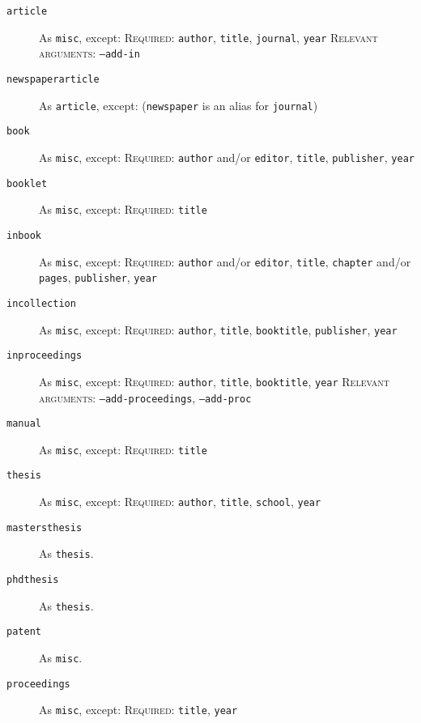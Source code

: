 \documentclass{article}
\begin{document}
\begin{description}
\item[\texttt{article}] As \texttt{misc}, except:
\textsc{Required:} \texttt{author}, \texttt{title}, \texttt{journal}, \texttt{year}
\textsc{Relevant arguments:} \texttt{--add-in}

\item[\texttt{newspaperarticle}] As \texttt{article}, except: (\texttt{newspaper} is an alias for \texttt{journal})

\item[\texttt{book}] As \texttt{misc}, except:
\textsc{Required:} \texttt{author} and/or \texttt{editor}, \texttt{title}, \texttt{publisher}, \texttt{year}

\item[\texttt{booklet}] As \texttt{misc}, except:
\textsc{Required:} \texttt{title}

\item[\texttt{inbook}] As \texttt{misc}, except:
\textsc{Required:} \texttt{author} and/or \texttt{editor}, \texttt{title}, \texttt{chapter} and/or \texttt{pages}, \texttt{publisher}, \texttt{year}

\item[\texttt{incollection}] As \texttt{misc}, except:
\textsc{Required:} \texttt{author}, \texttt{title}, \texttt{booktitle}, \texttt{publisher}, \texttt{year}

\item[\texttt{inproceedings}] As \texttt{misc}, except:
\textsc{Required:} \texttt{author}, \texttt{title}, \texttt{booktitle}, \texttt{year}
\textsc{Relevant arguments:} \texttt{--add-proceedings}, \texttt{--add-proc}

\item[\texttt{manual}] As \texttt{misc}, except:
\textsc{Required:} \texttt{title}

\item[\texttt{thesis}] As \texttt{misc}, except:
\textsc{Required:} \texttt{author}, \texttt{title}, \texttt{school}, \texttt{year}

\item[\texttt{mastersthesis}] As \texttt{thesis}.

\item[\texttt{phdthesis}] As \texttt{thesis}.

\item[\texttt{patent}] As \texttt{misc}.

\item[\texttt{proceedings}] As \texttt{misc}, except:
\textsc{Required:} \texttt{title}, \texttt{year}


\end{description}
\end{document}
